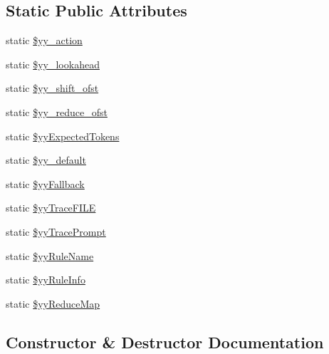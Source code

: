 \subsection*{Static Public Attributes}
\begin{DoxyCompactItemize}
\item 
static \hyperlink{class_smarty___internal___configfileparser_ac142a5b913ef2473f8499a30f4f6c1a0}{\$yy\+\_\+action}
\item 
static \hyperlink{class_smarty___internal___configfileparser_a3b8f838f9f7e95e02e4f0485fddc50f6}{\$yy\+\_\+lookahead}
\item 
static \hyperlink{class_smarty___internal___configfileparser_a2209e68ce0fccc5f4739e063ee42ef0e}{\$yy\+\_\+shift\+\_\+ofst}
\item 
static \hyperlink{class_smarty___internal___configfileparser_a3b856b0c76686b62efda7789aae55234}{\$yy\+\_\+reduce\+\_\+ofst}
\item 
static \hyperlink{class_smarty___internal___configfileparser_a1fe6200bd9f9078edd70b829fd19d5ee}{\$yy\+Expected\+Tokens}
\item 
static \hyperlink{class_smarty___internal___configfileparser_a025f876f20f1828678cf388d553f79d1}{\$yy\+\_\+default}
\item 
static \hyperlink{class_smarty___internal___configfileparser_a6b069092d56f15878677704d5febd9c9}{\$yy\+Fallback}
\item 
static \hyperlink{class_smarty___internal___configfileparser_a186aaee74f33406312b25b51f86bae04}{\$yy\+Trace\+F\+I\+L\+E}
\item 
static \hyperlink{class_smarty___internal___configfileparser_aa4ad5648a401cd049b70f63efcc4b5f3}{\$yy\+Trace\+Prompt}
\item 
static \hyperlink{class_smarty___internal___configfileparser_a38c2a9898ce64b9714635acfbfc291d7}{\$yy\+Rule\+Name}
\item 
static \hyperlink{class_smarty___internal___configfileparser_a1b2c73431788fbe1e01f52637b23b32d}{\$yy\+Rule\+Info}
\item 
static \hyperlink{class_smarty___internal___configfileparser_a17cfef4cb3aee573c01e8df05085eaf9}{\$yy\+Reduce\+Map}
\end{DoxyCompactItemize}


\subsection{Constructor \& Destructor Documentation}
\hypertarget{class_smarty___internal___configfileparser_a88f21d9c2bfefae24140906c124699cd}{}
